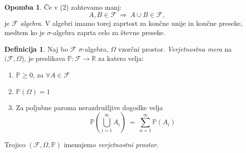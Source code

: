 \documentclass[11pt]{article}
\theoremstyle{definition}
\newtheorem{definicija}{Definicija}[section]
\theoremstyle{definition}
\theoremstyle{definition}
\newtheorem*{opomba}{Opomba}
\begin{document}
\begin{opomba}

Če v (2) zahtevamo manj:
$$A, B \in \mathcal{F} ~\Rightarrow~ A \cup B \in \mathcal{F},$$
je $\mathcal{F}$ \textit{algebra}. V algebri imamo torej zaprtost za končne unije in končne preseke, medtem ko je $\sigma$-algebra zaprta celo za števne preseke.

\end{opomba}
\vspace{0.5cm}

\begin{definicija}
Naj bo $\mathcal{F}$ $\sigma$-algebra, $\Omega$ vzorčni prostor. \textit{Verjetnostna mera} na $(\mathcal{F}, \Omega$), je preslikava $\mathbb{P}: \mathcal{F} \rightarrow \mathbb{R}$ za katero velja:
\begin{enumerate}
	\item $\mathbb{P} \geq 0$, za $\forall A \in \mathcal{F}$
	\item $\mathbb{P}(\Omega) = 1$
	\item Za poljubne paroma nerazdružljive dogodke velja
	$$\mathbb{P}\left( \bigcup_{i=1}^{\infty} A_i \right) ~=~ \sum_{n=1}^{\infty} \mathbb{P}(A_i)$$
\end{enumerate}
Trojico $(\mathcal{F}, \Omega, \mathbb{P})$ imenujemo \textit{verjetnostni prostor}.
\end{definicija}
\vspace{0.5cm}
\end{document}
